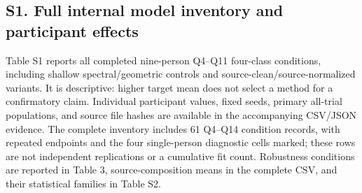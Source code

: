\documentclass[11pt]{article}
\begin{document}
\subsection*{S1. Full internal model inventory and participant effects}
Table S1 reports all completed nine-person Q4--Q11 four-class conditions, including shallow spectral/geometric controls and source-clean/source-normalized variants. It is descriptive: higher target mean does not select a method for a confirmatory claim. Individual participant values, fixed seeds, primary all-trial populations, and source file hashes are available in the accompanying CSV/JSON evidence. The complete inventory includes 61 Q4--Q14 condition records, with repeated endpoints and the four single-person diagnostic cells marked; these rows are not independent replications or a cumulative fit count. Robustness conditions are reported in Table 3, source-composition means in the complete CSV, and their statistical families in Table S2.
\end{document}
